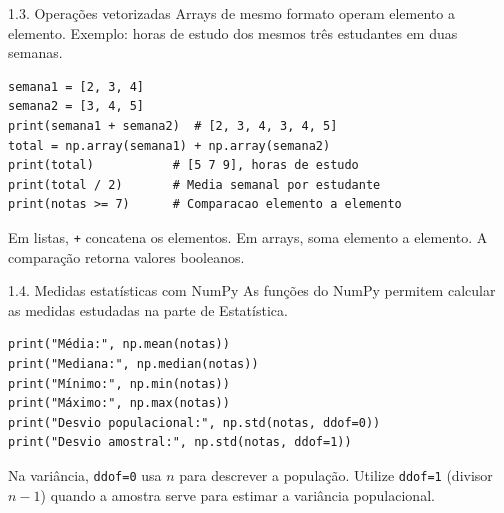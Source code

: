 \begin{frame}[fragile,t]{1.3. Operações vetorizadas}
Arrays de mesmo formato operam elemento a elemento. Exemplo: horas de estudo dos mesmos três estudantes em duas semanas.
\begin{lstlisting}
semana1 = [2, 3, 4]
semana2 = [3, 4, 5]
print(semana1 + semana2)  # [2, 3, 4, 3, 4, 5]
total = np.array(semana1) + np.array(semana2)
print(total)           # [5 7 9], horas de estudo
print(total / 2)       # Media semanal por estudante
print(notas >= 7)      # Comparacao elemento a elemento
\end{lstlisting}
\begin{EMASCnote}
Em listas, \texttt{+} concatena os elementos. Em arrays, soma elemento a elemento. A comparação retorna valores booleanos.
\end{EMASCnote}
\end{frame}

\begin{frame}[fragile,t]{1.4. Medidas estatísticas com NumPy}
As funções do NumPy permitem calcular as medidas estudadas na parte de Estatística.
\begin{lstlisting}
print("Média:", np.mean(notas))
print("Mediana:", np.median(notas))
print("Mínimo:", np.min(notas))
print("Máximo:", np.max(notas))
print("Desvio populacional:", np.std(notas, ddof=0))
print("Desvio amostral:", np.std(notas, ddof=1))
\end{lstlisting}
\begin{EMASCnote}
Na variância, \texttt{ddof=0} usa $n$ para descrever a população. Utilize \texttt{ddof=1} (divisor $n-1$) quando a amostra serve para estimar a variância populacional.
\end{EMASCnote}
\end{frame}
